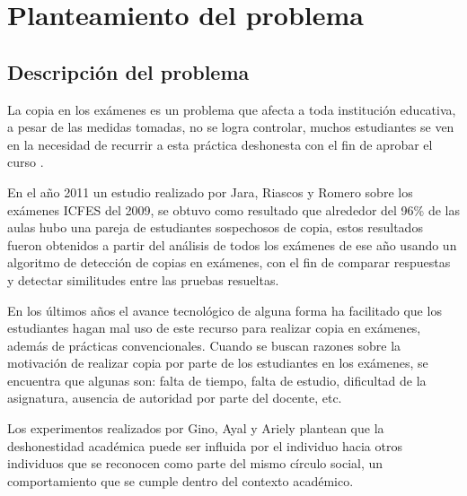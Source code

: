 \documentclass[../Main.tex]{subfiles}
\begin{document}
\section{Planteamiento del problema}

\subsection{Descripción del problema}

\begin{justify}
La copia en los exámenes es un problema que afecta a toda institución educativa, a pesar de las medidas tomadas, no se logra controlar, muchos estudiantes se ven en la necesidad de recurrir a esta práctica deshonesta con el fin de aprobar el curso \cite{1}.
\end{justify}\par

\begin{justify}
En el año 2011 un estudio realizado por Jara, Riascos y Romero \cite{2} sobre los exámenes ICFES del 2009, se obtuvo como resultado que alrededor del 96\% de las aulas hubo una pareja de estudiantes sospechosos de copia,  estos resultados fueron obtenidos a partir del análisis de todos los exámenes de ese año usando un algoritmo de detección de copias en exámenes, con el fin de comparar respuestas y detectar similitudes entre las pruebas resueltas.
\end{justify}\par

\begin{justify}
En los últimos años el avance tecnológico de alguna forma ha facilitado que los estudiantes hagan mal uso de este recurso para realizar copia en exámenes, además de prácticas convencionales. Cuando se buscan razones sobre la motivación de realizar copia por parte de los estudiantes en los exámenes, se encuentra que algunas son: falta de tiempo, falta de estudio, dificultad de la asignatura, ausencia de autoridad    por parte del docente, etc.
\end{justify}\par

\begin{justify}
Los experimentos realizados por Gino, Ayal y Ariely \cite{3} plantean que la deshonestidad académica puede ser influida por el individuo hacia otros individuos que se reconocen como parte del mismo círculo social, un comportamiento que se cumple dentro del contexto académico.
\end{justify}\par
\end{document}
